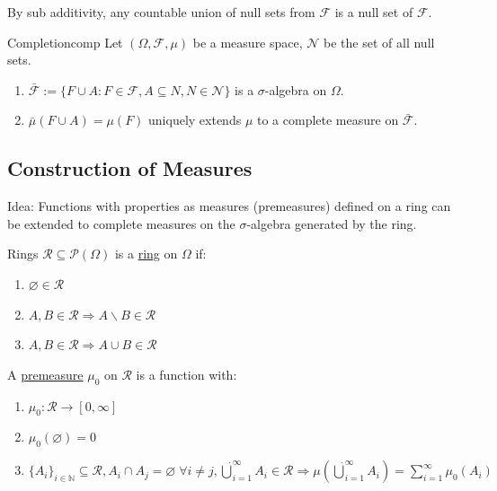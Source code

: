 \documentclass{article}
\begin{document}
	By sub additivity, any countable union of null sets from $\mathcal{F}$ is a null set of $\mathcal{F}$.
	
	\begin{mythm}{Completion}{comp}
	Let $(\Omega, \mathcal{F}, \mu)$ be a measure space, $\mathcal{N}$ be the set of all null sets.
		\begin{enumerate}
			\item $\bar{\mathcal{F}}:=\{F\cup A : F\in\mathcal{F}, A\subseteq N, N\in\mathcal{N}\}$ is a $\sigma$-algebra on $\Omega$.
			\item $\bar{\mu}(F\cup A)=\mu(F)$ uniquely extends $\mu$ to a complete measure on $\bar{\mathcal{F}}$.
		\end{enumerate}
	\end{mythm}
	
	\newpage\subsection{Construction of Measures}
	
	Idea: Functions with properties as measures (premeasures) defined on a ring can be extended
to complete measures on the $\sigma$-algebra generated by the ring.

	\begin{mydef}{Rings}{}
		$\mathcal{R}\subseteq\mathcal{P}(\Omega)$ is a \underline{ring} on $\Omega$ if:
		\begin{enumerate}
			\item $\varnothing\in\mathcal{R}$
			\item $A, B\in\mathcal{R}\Rightarrow A\backslash B\in\mathcal{R}$
			\item $A, B\in\mathcal{R}\Rightarrow A\cup B\in\mathcal{R}$
		\end{enumerate}
		
		A \underline{premeasure} $\mu_0$ on $\mathcal{R}$ is a function with:
		\begin{enumerate}[label=(\roman*)]
			\item $\mu_0 : \mathcal{R}\to[0, \infty]$
			\item $\mu_0(\varnothing)=0$
			\item $\{A_i\}_{i\in\mathbb{N}}\subseteq\mathcal{R}, A_i\cap A_j=\varnothing\;\forall i\neq j, \dot\bigcup_{i=1}^{\infty}A_i\in\mathcal{R}\Rightarrow\mu(\dot\bigcup_{i=1}^{\infty}A_i)=\sum_{i=1}^{\infty}\mu_0(A_i)$
		\end{enumerate}
	\end{mydef}
	
\end{document}

